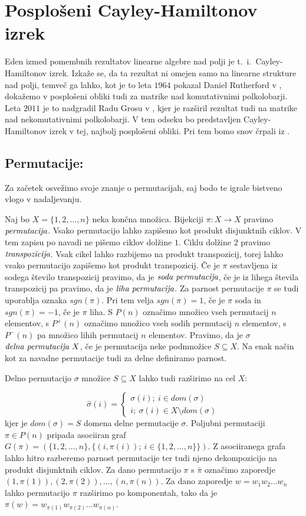 \documentclass[mat1]{fmfdelo}
\newcommand{\pojem}[1]{\ensuremath{\emph{#1}}}
\newcommand{\map}[3]{\ensuremath{{#1}:{#2}\rightarrow{#3}}}
\begin{document}
\section{Posplošeni Cayley-Hamiltonov izrek}\label{sect:CHT}
Eden izmed pomembnih rezultatov linearne algebre nad polji je t.~i.~Cayley-Hamiltonov izrek. Izkaže se, da ta rezultat ni omejen samo na linearne strukture nad polji, temveč ga lahko, kot je to leta $1964$ pokazal Daniel Rutherford v \cite{bib:Rutherford}, dokažemo v posplošeni obliki tudi za matrike nad komutativnimi polkolobarji. Leta $2011$ je to nadgradil Radu Grosu v \cite{bib:Grosu}, kjer je razširil rezultat tudi na matrike nad nekomutativnimi polkolobarji. V tem odseku bo predstavljen Cayley-Hamiltonov izrek v tej, najbolj posplošeni obliki. Pri tem bomo snov črpali iz \cite{bib:Grosu}.

\subsection{Permutacije:}\label{subsect:perm}
Za začetek osvežimo svoje znanje o permutacijah, saj bodo te igrale bistveno vlogo v nadaljevanju.
\begin{definicija}
	Naj bo $X=\{1, 2, \ldots, n\}$ neka končna množica. Bijekciji $\map{\pi}{X}{X}$ pravimo \pojem{permutacija}. Vsako permutacijo lahko zapišemo kot produkt disjunktnih ciklov. V tem zapisu po navadi ne pišemo ciklov dolžine $1$. Ciklu dolžine $2$ pravimo \pojem{transpozicija}. Vsak cikel lahko razbijemo na produkt transpozicij, torej lahko vsako permutacijo zapišemo kot produkt transpozicij. Če je $\pi$ sestavljena iz sodega število transpozicij pravimo, da je \pojem{soda permutacija}, če je iz lihega števila transpozicij pa pravimo, da je \pojem{liha permutacija}. Za parnost permutacije $\pi$ se tudi uporablja oznaka $sgn(\pi)$. Pri tem velja $sgn(\pi)=1$, če je $\pi$ soda in $sgn(\pi) = -1$, če je $\pi$ liha. S $P(n)$ označimo množico vseh permutacij $n$ elementov, s $P^{+}(n)$ označimo množico vseh sodih permutacij $n$ elementov, s $P^{-}(n)$ pa množico lihih permutacij $n$ elementov. 
	Pravimo, da je $\sigma$ \pojem{delna permutacija $X$}, če je permutacija neke podmnožice $S\subseteq X$. Na enak način kot za navadne permutacije tudi za delne definiramo parnost.
	
	Delno permutacijo $\sigma$ množice $S\subseteq X$ lahko tudi razširimo na cel $X$:
	
	$$
	\hat{\sigma}(i) = \begin{cases*}
		\sigma(i);~i\in dom(\sigma) \\
		i;~\sigma(i) \in X\setminus dom(\sigma)
	\end{cases*}
	$$
	kjer je $dom(\sigma) = S$ domena delne permutacije $\sigma$.
	Poljubni permutaciji $\pi\in P(n)$ pripada asociiran graf $G(\pi) = (\{1, 2, \ldots, n\}, \{(i, \pi(i));~i\in \{1, 2, \ldots, n\}\})$. Z asociiranega grafa lahko hitro razberemo parnost permutacije ter tudi njeno dekompozicijo na produkt disjunktnih ciklov.
	Za dano permutacijo $\pi$ s $\bar{\pi}$ označimo zaporedje $(1, \pi(1)), (2, \pi(2)), \ldots, (n, \pi(n))$. Za dano zaporedje $w = w_1w_2\ldots w_n$ lahko permutacijo $\pi$ razširimo po komponentah, tako da je $\pi(w) = w_{\pi(1)}w_{\pi(2)}\ldots w_{\pi(n)}$.
\end{definicija}
\end{document}
